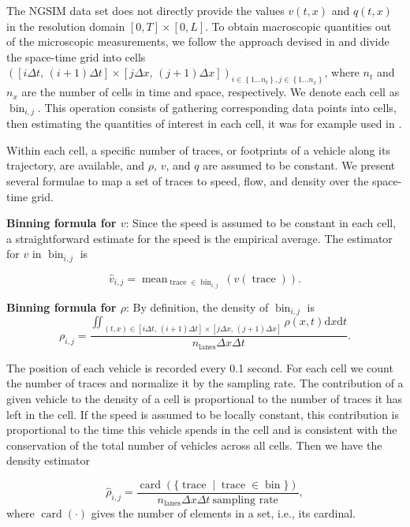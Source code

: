 \documentclass[5p,twocolumn]{elsarticle}
\DeclareMathOperator{\card}{card}
\DeclareMathOperator{\trc}{trace}
\DeclareMathOperator{\mean}{mean}
\DeclareMathOperator{\bin}{bin}
\DeclareMathOperator{\lns}{lanes}
\begin{document}
The NGSIM data set does not directly provide the values $v(t,x)$
and $q(t,x)$ in the resolution domain $\left[0,T\right]\times\left[0,L\right]$. To obtain macroscopic quantities out of the microscopic measurements, we follow the approach devised in \cite{edie1963discussion} and divide the space-time grid into cells $\left(\left[i\Delta t,\, \left(i+1\right)\Delta t\right]\times\left[j\Delta x, \, (j+1)\Delta x\right]\right)_{i\in\left\{ 1\ldots n_{t}\right\} ,j\in\left\{ 1\ldots n_{x}\right\} }$, where $n_t$ and $n_x$ are the number of cells in time and space, respectively. We denote each cell as $\bin_{i,j}$. This operation consists of gathering corresponding data points into cells, then estimating the quantities of interest in each cell, it was for example used in \cite{Piccoli201532}.

Within each cell, a specific number of traces, or footprints of a vehicle along its trajectory, are available, and $\rho$, $v$, and $q$ are assumed to be constant. We present several formulae to map a set of traces to speed, flow, and density over the space-time grid. 

\textbf{Binning formula for $v$}: Since the speed is assumed to be constant in each cell, a straightforward estimate for the speed is the empirical average. The estimator for $v$ in $\bin_{i,j}$ is

\begin{equation}
\widehat{v}_{i,j}=\mean_{\trc \in \bin_{i,j}}(v(\trc)).
\end{equation}

\textbf{Binning formula for $\rho$}: By definition, the density of $\bin_{i,j}$ is  
\begin{equation}
\rho_{i,j}=
\frac{\iint_{\left(t,x\right)\in [i\Delta t, \,(i+1)\Delta t] \times [j\Delta x,\,(j+1)\Delta x]}\rho(x,t) \text{d}x \text{d}t}
{n_{\lns}\Delta x\Delta t}
.
\end{equation}

The position of each vehicle is recorded every 0.1 second. For each cell we count the number of traces and normalize it by the sampling rate. The contribution of a given vehicle to the density of a cell is proportional to the number of traces it has left in the cell. If the speed is assumed to be locally constant, this contribution is proportional to the time this vehicle spends in the cell and is consistent with the conservation of the total number of vehicles across all cells. Then we have the density estimator


\begin{equation}
\widehat{\rho}_{i,j}=
\frac{\card ( \{ \trc \mid \trc \in \bin \})}
{n_{\lns} \Delta x \Delta t \: \text{sampling rate}},
\end{equation}
where $\card (\cdot)$ gives the number of elements in a set, i.e., its cardinal. 
\end{document}
